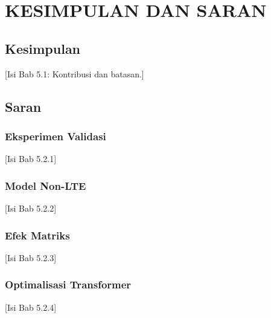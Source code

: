\chapter{KESIMPULAN DAN SARAN}

\section{Kesimpulan}
[Isi Bab 5.1: Kontribusi dan batasan.]

\section{Saran}
\subsection{Eksperimen Validasi}
[Isi Bab 5.2.1]

\subsection{Model Non-LTE}
[Isi Bab 5.2.2]

\subsection{Efek Matriks}
[Isi Bab 5.2.3]

\subsection{Optimalisasi Transformer}
[Isi Bab 5.2.4]

\begin{comment}

\end{comment}